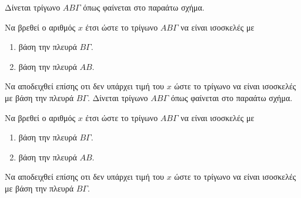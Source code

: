 Δίνεται τρίγωνο $ AB\varGamma $ όπως φαίνεται στο παραάτω σχήμα.
Να βρεθεί ο αριθμός $ x $ έτσι ώστε το τρίγωνο $AB\varGamma$ να είναι ισοσκελές με 
\begin{enumerate}[itemsep=0mm,label=\roman*.]
\item βάση την πλευρά $B\varGamma$.
\item βάση την πλευρά $AB$.
\end{enumerate}
Να αποδειχθεί επίσης οτι δεν υπάρχει τιμή του $x$ ώστε το τρίγωνο να είναι ισοσκελές με βάση την πλευρά $B\varGamma$.
Δίνεται τρίγωνο $ AB\varGamma $ όπως φαίνεται στο παραάτω σχήμα.
Να βρεθεί ο αριθμός $ x $ έτσι ώστε το τρίγωνο $AB\varGamma$ να είναι ισοσκελές με 
\begin{enumerate}[itemsep=0mm,label=\roman*.]
\item βάση την πλευρά $B\varGamma$.
\item βάση την πλευρά $AB$.
\end{enumerate}
Να αποδειχθεί επίσης οτι δεν υπάρχει τιμή του $x$ ώστε το τρίγωνο να είναι ισοσκελές με βάση την πλευρά $B\varGamma$.
